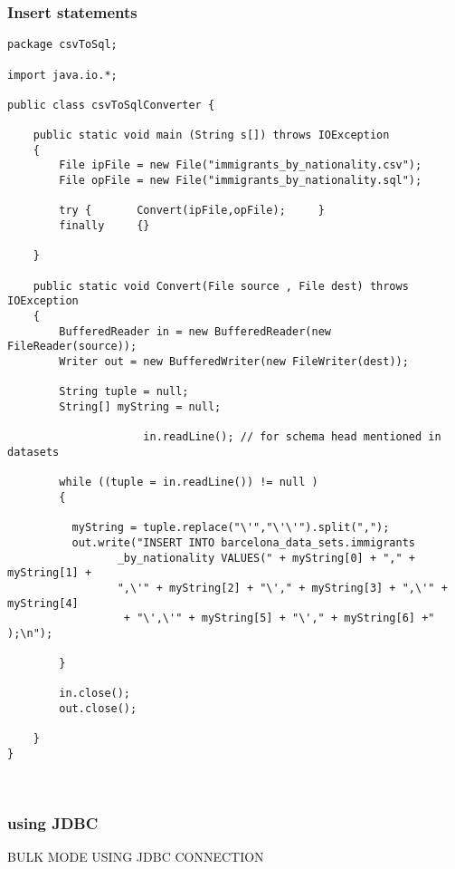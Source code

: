 \documentclass[10pt]{article}
\begin{document}
\subsubsection{Insert statements}
\begin{lstlisting}[frame=single]
package csvToSql;

import java.io.*;

public class csvToSqlConverter {

	public static void main (String s[]) throws IOException
	{
		File ipFile = new File("immigrants_by_nationality.csv");
		File opFile = new File("immigrants_by_nationality.sql");
		
		try {		Convert(ipFile,opFile);		}
		finally		{}
				
	}
	
	public static void Convert(File source , File dest) throws IOException
	{
		BufferedReader in = new BufferedReader(new FileReader(source));
		Writer out = new BufferedWriter(new FileWriter(dest));

		String tuple = null;
		String[] myString = null;
			            
                     in.readLine(); // for schema head mentioned in datasets
            
		while ((tuple = in.readLine()) != null )
		{
				
		  myString = tuple.replace("\'","\'\'").split(",");
		  out.write("INSERT INTO barcelona_data_sets.immigrants
                 _by_nationality VALUES(" + myString[0] + "," + myString[1] +
                 ",\'" + myString[2] + "\'," + myString[3] + ",\'" + myString[4]
                  + "\',\'" + myString[5] + "\'," + myString[6] +" );\n");

		}

		in.close();
		out.close();
		
	}
}



\end{lstlisting}

\subsubsection{using JDBC}

BULK MODE USING JDBC CONNECTION 
\end{document}
